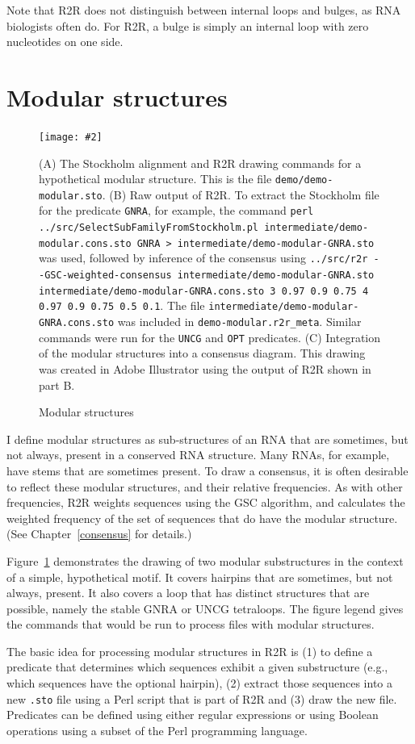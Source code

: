 \documentclass[letterpaper,12pt]{report}
\newcommand{\fig}[4]{
\begin{figure}
\texttt{[image: \#2]}
\caption{#3}

\begin{small}
#4
\end{small}
\label{#1}
\end{figure}
}
\begin{document}
Note that R2R does not distinguish between internal loops and bulges, as RNA biologists often do.  For R2R, a bulge is simply an internal loop with zero nucleotides on one side.

\section{Modular structures}
\label{sec:modular}
\fig{fig:modular}{figures/modular-demo.pdf}{Modular structures}{
(A)
The Stockholm alignment and R2R drawing commands for a hypothetical modular structure.
This is the file {\tt demo/demo-modular.sto}.
(B)
Raw output of R2R.
To extract the Stockholm file for the predicate {\tt GNRA}, for example, the 
command {\tt perl ../src/SelectSubFamilyFromStockholm.pl intermediate/demo-modular.cons.sto GNRA > intermediate/demo-modular-GNRA.sto} was used, followed by inference of the consensus using {\tt ../src/r2r -{}-GSC-weighted-consensus intermediate/demo-modular-GNRA.sto intermediate/demo-modular-GNRA.cons.sto 3 0.97 0.9 0.75 4 0.97 0.9 0.75 0.5 0.1}.
The file {\tt intermediate/demo-modular-GNRA.cons.sto} was included in {\tt demo-modular.r2r\_meta}.  Similar commands were run for the 
{\tt UNCG} and {\tt OPT} predicates.
(C)
Integration of the modular structures into a consensus diagram.  This drawing was created in Adobe Illustrator using the output of R2R shown in part B.
}
I define modular structures as sub-structures of an RNA that are sometimes, but not always, present in a conserved RNA structure.
Many RNAs, for example, have stems that are sometimes present.
To draw a consensus, it is often desirable to reflect these modular structures, and their relative frequencies.
As with other frequencies, R2R weights sequences using the GSC algorithm, and calculates the weighted frequency of the set
of sequences that do have the modular structure.
(See Chapter~\ref{consensus} for details.)

Figure~\ref{fig:modular} demonstrates the drawing of two modular substructures in the context of a simple, hypothetical motif.
It covers hairpins that are sometimes, but not always, present. It also covers a loop that has distinct structures that are
possible, namely the stable GNRA or UNCG tetraloops.
The figure legend gives the commands that would be run to process files with modular structures.

The basic idea for processing modular structures in R2R is 
(1) to define a predicate that determines which sequences exhibit a given substructure (e.g., which sequences have the
optional hairpin),
(2) extract those sequences into a new {\tt .sto} file using a Perl script that is part of R2R
and (3) draw the new file.
Predicates can be defined using either regular expressions or using Boolean operations using a subset of the Perl programming language.
\end{document}
